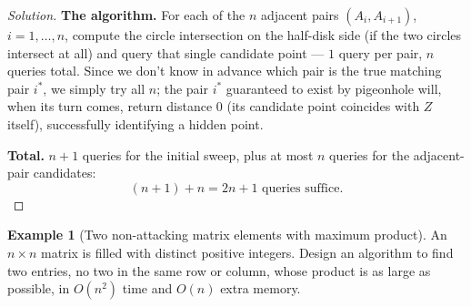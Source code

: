 \documentclass[11pt]{article}
\theoremstyle{definition}
\newtheorem{example}{Example}[section]
\begin{document}
\begin{proof}[Solution]
\textbf{The algorithm.} For each of the $n$ adjacent pairs $(A_i,A_{i+1})$, $i=1,\dots,n$, compute the circle intersection on the half-disk side (if the two circles intersect at all) and query that single candidate point — $1$ query per pair, $n$ queries total. Since we don't know in advance which pair is the true matching pair $i^*$, we simply try all $n$; the pair $i^*$ guaranteed to exist by pigeonhole will, when its turn comes, return distance $0$ (its candidate point coincides with $Z$ itself), successfully identifying a hidden point.

\textbf{Total.} $n+1$ queries for the initial sweep, plus at most $n$ queries for the adjacent-pair candidates:
\[
\boxed{(n+1)+n=2n+1\text{ queries suffice}}.
\]
\end{proof}

\begin{example}[Two non-attacking matrix elements with maximum product]
An $n\times n$ matrix is filled with distinct positive integers. Design an algorithm to find two entries, no two in the same row or column, whose product is as large as possible, in $O(n^2)$ time and $O(n)$ extra memory.
\end{example}
\end{document}
